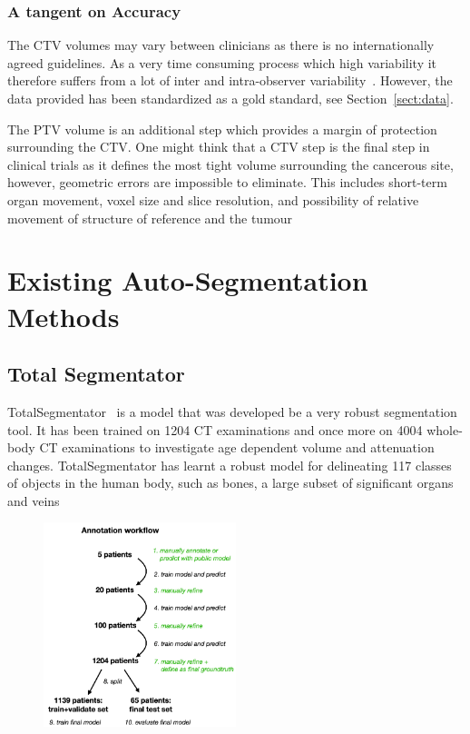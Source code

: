 \documentclass[12pt,twoside]{report}
\begin{document}
\subsubsection{A tangent on Accuracy}

The CTV volumes may vary between clinicians as there is no internationally agreed guidelines. As a very time consuming process which high variability it therefore suffers from a lot of inter and intra-observer variability~\cite{Lin2021-oz}. However, the data provided has been standardized as a gold standard, see Section~\ref{sect:data}.

The PTV volume is an additional step which provides a margin of protection surrounding the CTV. One might think that a CTV step is the final step in clinical trials as it defines the most tight volume surrounding the cancerous site, however, geometric errors are impossible to eliminate. This includes short-term organ movement, voxel size and slice resolution, and possibility of relative movement of structure of reference and the tumour~\cite{VANHERK200452}

\section{Existing Auto-Segmentation Methods}\label{sect:existing-auto-segmentation-methods}

\subsection{Total Segmentator}\label{sect:totalseg}

TotalSegmentator~\cite{totalsegmentor-paper} is a model that was developed be a very robust segmentation tool. It has been trained on 1204 CT examinations and once more on 4004 whole-body CT examinations to investigate age dependent volume and attenuation changes. TotalSegmentator has learnt a robust model for delineating 117 classes of objects in the human body, such as bones, a large subset of significant organs and veins~\cite{totalsegmentor-git}

\begin{figure}
  \centering
  \includegraphics*[width=0.5\textwidth]{../figures/AnnotationWorkflow.png}
\end{figure} 
\end{document}
